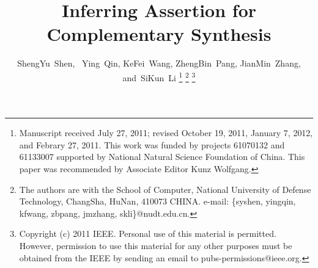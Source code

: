 \documentclass[journal]{IEEEtran}
\begin{document}
%
\title{Inferring Assertion for Complementary Synthesis}
%
%
%

\author{ShengYu~Shen,~
        Ying~Qin,
        KeFei~Wang,
        ZhengBin~Pang,
        JianMin~Zhang,
        and~SiKun~Li%
\thanks{Manuscript received July 27, 2011; 
revised October 19, 2011, January
7, 2012, and Febrary 27, 2011.
This work was funded by projects 61070132 and 61133007 supported by National Natural Science Foundation of China.
This paper was recommended by Associate Editor Kunz Wolfgang.}
\thanks{The authors are with the School of Computer,
National University of Defense Technology, ChangSha,
HuNan, 410073 CHINA. e-mail: \{syshen, yingqin, kfwang, zbpang, jmzhang, skli\}@nudt.edu.cn.}%
\thanks{Copyright (c) 2011 IEEE. Personal use of this material is
permitted. However, permission to use this material
for any other purposes must be obtained from the IEEE by
sending an email to pubs-permissions@ieee.org.
}
}
\end{document}
